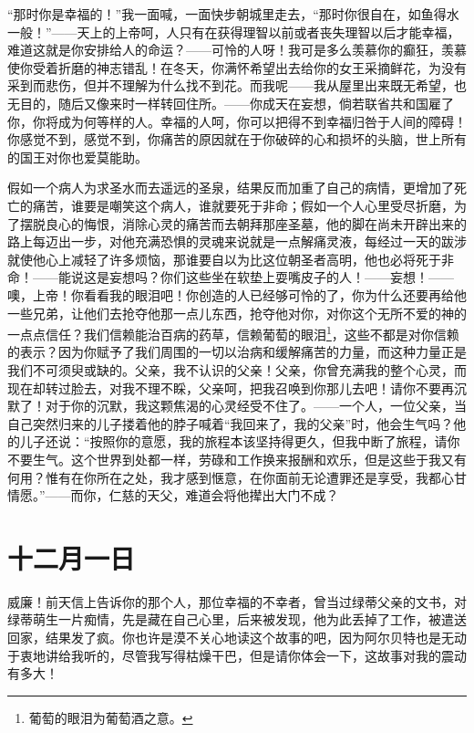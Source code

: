 \documentclass[12pt,oneside]{book}
\begin{document}
“那时你是幸福的！”我一面喊，一面快步朝城里走去，“那时你很自在，如鱼得水一般！”——天上的上帝呵，人只有在获得理智以前或者丧失理智以后才能幸福，难道这就是你安排给人的命运？——可怜的人呀！我可是多么羡慕你的癫狂，羡慕使你受着折磨的神志错乱！在冬天，你满怀希望出去给你的女王采摘鲜花，为没有采到而悲伤，但并不理解为什么找不到花。而我呢——我从屋里出来既无希望，也无目的，随后又像来时一样转回住所。——你成天在妄想，倘若联省共和国雇了你，你将成为何等样的人。幸福的人呵，你可以把得不到幸福归咎于人间的障碍！你感觉不到，感觉不到，你痛苦的原因就在于你破碎的心和损坏的头脑，世上所有的国王对你也爱莫能助。

假如一个病人为求圣水而去遥远的圣泉，结果反而加重了自己的病情，更增加了死亡的痛苦，谁要是嘲笑这个病人，谁就要死于非命；假如一个人心里受尽折磨，为了摆脱良心的悔恨，消除心灵的痛苦而去朝拜那座圣墓，他的脚在尚未开辟出来的路上每迈出一步，对他充满恐惧的灵魂来说就是一点解痛灵液，每经过一天的跋涉就使他心上减轻了许多烦恼，那谁要自以为比这位朝圣者高明，他也必将死于非命！——能说这是妄想吗？你们这些坐在软垫上耍嘴皮子的人！——妄想！——噢，上帝！你看看我的眼泪吧！你创造的人已经够可怜的了，你为什么还要再给他一些兄弟，让他们去抢夺他那一点儿东西，抢夺他对你，对你这个无所不爱的神的一点点信任？我们信赖能治百病的药草，信赖葡萄的眼泪\footnote{葡萄的眼泪为葡萄酒之意。}，这些不都是对你信赖的表示？因为你赋予了我们周围的一切以治病和缓解痛苦的力量，而这种力量正是我们不可须臾或缺的。父亲，我不认识的父亲！父亲，你曾充满我的整个心灵，而现在却转过脸去，对我不理不睬，父亲呵，把我召唤到你那儿去吧！请你不要再沉默了！对于你的沉默，我这颗焦渴的心灵经受不住了。——一个人，一位父亲，当自己突然归来的儿子搂着他的脖子喊着“我回来了，我的父亲”时，他会生气吗？他的儿子还说：“按照你的意愿，我的旅程本该坚持得更久，但我中断了旅程，请你不要生气。这个世界到处都一样，劳碌和工作换来报酬和欢乐，但是这些于我又有何用？惟有在你所在之处，我才感到惬意，在你面前无论遭罪还是享受，我都心甘情愿。”——而你，仁慈的天父，难道会将他撵出大门不成？
　　

\chapter{十二月一日}
\label{sec-4-32}
威廉！前天信上告诉你的那个人，那位幸福的不幸者，曾当过绿蒂父亲的文书，对绿蒂萌生一片痴情，先是藏在自己心里，后来被发现，他为此丢掉了工作，被遣送回家，结果发了疯。你也许是漠不关心地读这个故事的吧，因为阿尔贝特也是无动于衷地讲给我听的，尽管我写得枯燥干巴，但是请你体会一下，这故事对我的震动有多大！
　　
\end{document}
